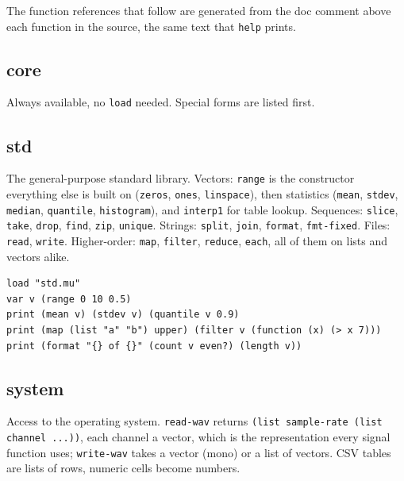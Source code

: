 \documentclass[11pt,a4paper]{article}
\newcommand{\musil}[1]{\lstinline[style=musilinline]{#1}}
\begin{document}
The function references that follow are generated from the doc comment above each
function in the source, the same text that \musil{help} prints.

\subsection{core}

Always available, no \musil{load} needed. Special forms are listed first.



\subsection{std}

The general-purpose standard library. Vectors: \musil{range} is the constructor
everything else is built on (\musil{zeros}, \musil{ones}, \musil{linspace}),
then statistics (\musil{mean}, \musil{stdev}, \musil{median}, \musil{quantile},
\musil{histogram}), and \musil{interp1} for table lookup. Sequences: \musil{slice},
\musil{take}, \musil{drop}, \musil{find}, \musil{zip}, \musil{unique}. Strings:
\musil{split}, \musil{join}, \musil{format}, \musil{fmt-fixed}. Files: \musil{read},
\musil{write}. Higher-order: \musil{map}, \musil{filter}, \musil{reduce},
\musil{each}, all of them on lists and vectors alike.

\begin{lstlisting}
load "std.mu"
var v (range 0 10 0.5)
print (mean v) (stdev v) (quantile v 0.9)
print (map (list "a" "b") upper) (filter v (function (x) (> x 7)))
print (format "{} of {}" (count v even?) (length v))
\end{lstlisting}



\subsection{system}

Access to the operating system. \musil{read-wav} returns
\musil{(list sample-rate (list channel ...))}, each channel a vector, which is the
representation every signal function uses; \musil{write-wav} takes a vector (mono) or
a list of vectors. CSV tables are lists of rows, numeric cells become numbers.
\end{document}
